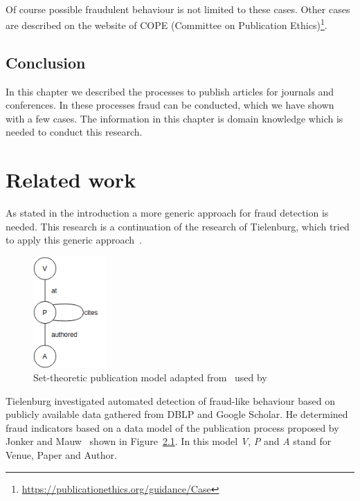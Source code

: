 \documentclass{ou-report}
\begin{document}
\ \\
Of course possible fraudulent behaviour is not limited to these cases. Other 
cases are described on the website of COPE (Committee on Publication
Ethics)\footnote{\url{https://publicationethics.org/guidance/Case}}.

\section{Conclusion}
In this chapter we described the processes to publish articles for journals and
conferences. In these processes fraud can be conducted, which we have shown with
a few cases. The information in this chapter is domain knowledge which is needed
to conduct this research.

\chapter{Related work}
\label{chp:related_work}

As stated in the introduction a more generic approach for fraud detection is 
needed. This research is a continuation of the research of Tielenburg, which
tried to apply this generic approach~\cite{TEJ2017}.

\begin{figure}
    \centering
    \includegraphics[width=0.25\textwidth]{images/jm2017_undiced_pub_view.drawio.png}
    \caption{Set-theoretic publication model adapted from~\cite{JM2017} used 
by~\cite{TEJ2017}}
    \label{fig:rw_jm2017}
\end{figure}

Tielenburg investigated automated detection of fraud-like behaviour based on
publicly available data ga\-thered from DBLP and Google Scholar. He determined 
fraud indicators based on a data model of the publication process proposed by 
Jonker and Mauw~\cite{JM2017} shown in Figure~\ref{fig:rw_jm2017}. In this 
model \textit{V}, \textit{P} and \textit{A} stand for Venue, Paper and Author.
\end{document}
